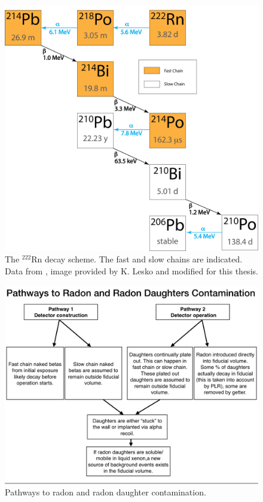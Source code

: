 \begin{figure}[ht]
    \centering
    \includegraphics[width=\textwidth]{figures/radon/222Rn_simple_poster.png}
    \caption{The $^{222}$Rn decay scheme. The fast and slow chains are indicated. Data from \cite{LNHB}, image provided by K. Lesko and modified for this thesis.}
    \label{fig:Rn222}
\end{figure}

\begin{figure}[ht]
    \centering
    \includegraphics[width=\textwidth]{figures/radon/Rnpathways.png}
    \caption{Pathways to radon and radon daughter contamination.}
    \label{fig:flow_chart}
\end{figure}


